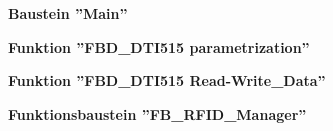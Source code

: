 \textbf{\LARGE Baustein ''Main''}
\setcounter{chapter}{1}

\textbf{\LARGE Funktion ''FBD\_DTI515 parametrization''}
\setcounter{chapter}{2}

\textbf{\LARGE Funktion ''FBD\_DTI515 Read-Write\_Data''}
\setcounter{chapter}{3}

\textbf{\LARGE Funktionsbaustein ''FB\_RFID\_Manager''}
\setcounter{chapter}{4}

%